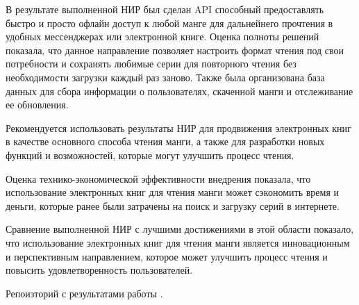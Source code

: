 \conclusion

В результате выполненной НИР был сделан API способный предоставлять быстро и просто офлайн доступ к любой манге для дальнейнего прочтения в удобных мессенджерах или электронной книге.
Оценка полноты решений показала, что данное направление позволяет настроить формат чтения под свои потребности и сохранять любимые серии для повторного чтения без необходимости загрузки каждый раз заново.
Также была организована база данных для сбора информации о пользователях, скаченной манги и отслеживание ее обновления.

Рекомендуется использовать результаты НИР для продвижения электронных книг в качестве основного способа чтения манги, 
а также для разработки новых функций и возможностей, которые могут улучшить процесс чтения.

Оценка технико-экономической эффективности внедрения показала, что использование электронных книг для чтения манги может сэкономить время и деньги, 
которые ранее были затрачены на поиск и загрузку серий в интернете.

Сравнение выполненной НИР с лучшими достижениями в этой области показало, 
что использование электронных книг для чтения манги является инновационным и перспективным направлением, 
которое может улучшить процесс чтения и повысить удовлетворенность пользователей.

Репоизторий с результатами работы \cite{result-cite}.